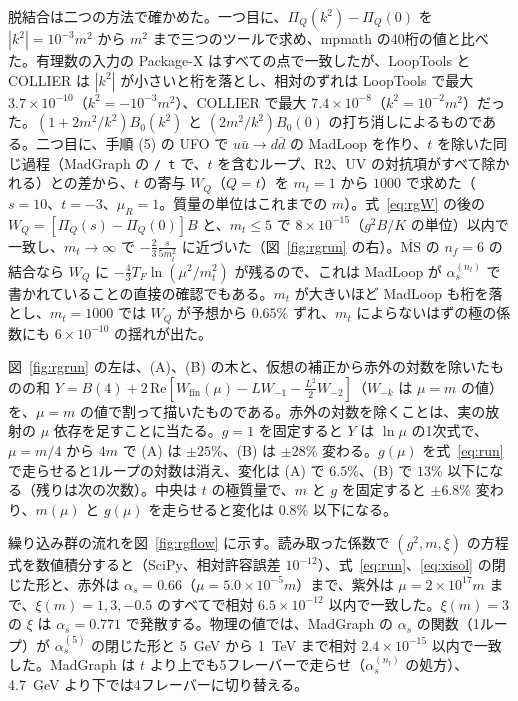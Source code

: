 \documentclass[a4paper,10pt]{ltjsarticle}
\newcommand{\MSbar}{\overline{\mathrm{MS}}}
\begin{document}
脱結合は二つの方法で確かめた。一つ目に、$\Pi_Q(k^2)-\Pi_Q(0)$ を $|k^2|=10^{-3}m^2$ から $m^2$ まで三つのツールで求め、mpmath の40桁の値と比べた。有理数の入力の Package-X はすべての点で一致したが、LoopTools と COLLIER は $|k^2|$ が小さいと桁を落とし、相対のずれは LoopTools で最大 $3.7\times10^{-10}$（$k^2=-10^{-3}m^2$）、COLLIER で最大 $7.4\times10^{-8}$（$k^2=10^{-2}m^2$）だった。$(1+2m^2/k^2)B_0(k^2)$ と $(2m^2/k^2)B_0(0)$ の打ち消しによるものである。二つ目に、手順 (5) の UFO で $u\bar u\to d\bar d$ の MadLoop を作り、$t$ を除いた同じ過程（MadGraph の \texttt{/ t} で、$t$ を含むループ、R2、UV の対抗項がすべて除かれる）との差から、$t$ の寄与 $W_Q$（$Q=t$）を $m_t=1$ から $1000$ で求めた（$s=10$、$t=-3$、$\mu_R=1$。質量の単位はこれまでの $m$）。式~\eqref{eq:rgW} の後の $W_Q=[\Pi_Q(s)-\Pi_Q(0)]B$ と、$m_t\le5$ で $8\times10^{-15}$（$g^2B/K$ の単位）以内で一致し、$m_t\to\infty$ で $-\frac23\frac{s}{5m_t^2}$ に近づいた（図~\ref{fig:rgrun} の右）。$\MSbar$ の $n_f=6$ の結合なら $W_Q$ に $-\frac43T_F\ln(\mu^2/m_t^2)$ が残るので、これは MadLoop が $\alpha_s^{(n_l)}$ で書かれていることの直接の確認でもある。$m_t$ が大きいほど MadLoop も桁を落とし、$m_t=1000$ では $W_Q$ が予想から $0.65\%$ ずれ、$m_t$ によらないはずの極の係数にも $6\times10^{-10}$ の揺れが出た。

図~\ref{fig:rgrun} の左は、(A)、(B) の木と、仮想の補正から赤外の対数を除いたものの和 $Y=B(4)+2\,\mathrm{Re}[W_{\mathrm{fin}}(\mu)-LW_{-1}-\frac{L^2}2W_{-2}]$（$W_{-k}$ は $\mu=m$ の値）を、$\mu=m$ の値で割って描いたものである。赤外の対数を除くことは、実の放射の $\mu$ 依存を足すことに当たる。$g=1$ を固定すると $Y$ は $\ln\mu$ の1次式で、$\mu=m/4$ から $4m$ で (A) は $\pm25\%$、(B) は $\pm28\%$ 変わる。$g(\mu)$ を式~\eqref{eq:run} で走らせると1ループの対数は消え、変化は (A) で $6.5\%$、(B) で $13\%$ 以下になる（残りは次の次数）。中央は $t$ の極質量で、$m$ と $g$ を固定すると $\pm6.8\%$ 変わり、$m(\mu)$ と $g(\mu)$ を走らせると変化は $0.8\%$ 以下になる。

繰り込み群の流れを図~\ref{fig:rgflow} に示す。読み取った係数で $(g^2,m,\xi)$ の方程式を数値積分すると（SciPy、相対許容誤差 $10^{-12}$）、式~\eqref{eq:run}、\eqref{eq:xisol} の閉じた形と、赤外は $\alpha_s=0.66$（$\mu=5.0\times10^{-5}m$）まで、紫外は $\mu=2\times10^{17}m$ まで、$\xi(m)=1,3,-0.5$ のすべてで相対 $6.5\times10^{-12}$ 以内で一致した。$\xi(m)=3$ の $\xi$ は $\alpha_s=0.771$ で発散する。物理の値では、MadGraph の $\alpha_s$ の関数（1ループ）が $\alpha_s^{(5)}$ の閉じた形と 5~GeV から 1~TeV まで相対 $2.4\times10^{-15}$ 以内で一致した。MadGraph は $t$ より上でも5フレーバーで走らせ（$\alpha_s^{(n_l)}$ の処方）、4.7~GeV より下では4フレーバーに切り替える。
\end{document}
